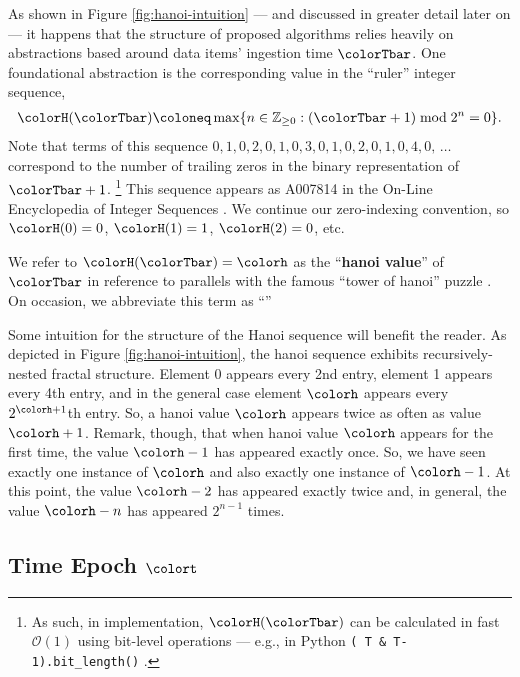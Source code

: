 

As shown in Figure \ref{fig:hanoi-intuition} --- and discussed in greater detail later on --- it happens that the structure of proposed algorithms relies heavily on abstractions based around data items' ingestion time $\colorTbar$.
One foundational abstraction is the corresponding value in the ``ruler'' integer sequence,
\begin{align}
\colorH(\colorTbar)
\coloneq
\max \{ n \in \mathbb{Z}_{\geq0} : (\colorTbar + 1) \bmod 2^n = 0 \}.
\label{eqn:hanoi-defn}
\end{align}
Note that terms of this sequence $0,\allowbreak 1,\allowbreak 0,\allowbreak 2,\allowbreak 0,\allowbreak 1,\allowbreak 0,\allowbreak 3,\allowbreak 0,\allowbreak 1,\allowbreak 0,\allowbreak 2,\allowbreak 0,\allowbreak 1,\allowbreak 0,\allowbreak 4,\allowbreak 0,\allowbreak \,\ldots$ correspond to the number of trailing zeros in the binary representation of $\colorTbar + 1$.%
\footnote{%
As such, in implementation, $\colorH(\colorTbar)$ can be calculated in fast $\mathcal{O}(1)$ using bit-level operations --- e.g., in Python \texttt{(~T \& T-1).bit\_length()} \citep{oeis}.
}
This sequence appears as A007814 in the On-Line Encyclopedia of Integer Sequences \citep{oeis}.
We continue our zero-indexing convention, so $\colorH(0) = 0$, $\colorH(1) = 1$, $\colorH(2) = 0$, etc.

We refer to $\colorH(\colorTbar) = \colorh$ as the ``\textbf{hanoi value}'' of $\colorTbar$ in reference to parallels with the famous ``tower of hanoi'' puzzle \citep{lucas1889jeux}.
On occasion, we abbreviate this term as ``\hv{}''

Some intuition for the structure of the Hanoi sequence will benefit the reader.
As depicted in Figure \ref{fig:hanoi-intuition}, the hanoi sequence exhibits recursively-nested fractal structure.
Element 0 appears every 2nd entry, element 1 appears every 4th entry, and in the general case element $\colorh$ appears every $2^{\colorh+1}$th entry.
So, a hanoi value $\colorh$ appears twice as often as value $\colorh + 1$.
Remark, though, that when hanoi value $\colorh$ appears for the first time, the value $\colorh - 1$ has appeared exactly once.
So, we have seen exactly one instance of $\colorh$ and also exactly one instance of $\colorh - 1$.
At this point, the value $\colorh - 2$ has appeared exactly twice and, in general, the value $\colorh - n$ has appeared $2^{n - 1}$ times.

\subsection{Time Epoch $\colort$}
\label{sec:notation-epoch}

